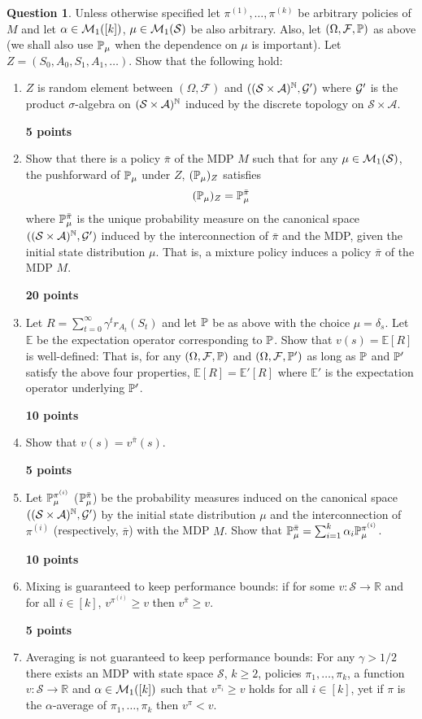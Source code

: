 \documentclass{article}
\newcommand{\R}{\mathbb{R}}
\DeclareMathOperator*{\1}{\mathbbm{1}}
\newcommand{\E}{\mathbb E}
\newcommand{\cF}{\mathcal{F}}
\newcommand{\0}{\mathbf{0}}
\newcounter{DocPoints}
\newcounter{QuestionPoints}
\newcommand{\points}[1]{	\par\mbox{}\par\noindent\hfill {\bf #1 points}	\addtocounter{DocPoints}{#1}
	\addtocounter{QuestionPoints}{#1}
}
\theoremstyle{definition}
\newtheorem{question}{Question}
\theoremstyle{remark}
\theoremstyle{theorem}
\newcommand{\cS}{\mathcal{S}}
\newcommand{\cA}{\mathcal{A}}
\begin{document}
\begin{question}
Unless otherwise specified let
 $\pi^{(1)},\dots,\pi^{(k)}$ be arbitrary policies of $M$ and let $\alpha\in \mathcal{M}_1([k])$, $\mu \in \cM_1(\cS)$ be also arbitrary.
 Also, let $(\Omega,\cF,\PP)$ as above (we shall also use $\mathbb{P}_\mu$ when the dependence on $\mu$ is important).
 Let
 $Z = (S_0,A_0,S_1,A_1,\dots)$.
Show that the following hold:
\begin{enumerate}
\item $Z$ is random element between $(\Omega,\cF)$ and $((\cS\times \cA)^{\N},\cG')$ where $\mathcal{G}'$ is the product $\sigma$-algebra on $(\cS\times \cA)^{\N}$
induced by the discrete topology on $\cS \times \cA$.
\points{5}
\item
\label{q1:a3:1}
Show that there is a policy $\bar \pi$ of the MDP $M$ such that for any $\mu \in \cM_1(\cS)$,
the pushforward of $\mathbb{P}_\mu$ under $Z$, $(\mathbb{P}_\mu)_Z$ satisfies
\[
(\mathbb{P}_\mu)_Z =\mathbb{P}_\mu^{\bar \pi}
\]
where $\mathbb{P}_\mu^{\bar \pi}$ is the unique probability measure on
the canonical space $((\cS\times \cA)^{\N},\cG')$
induced
by the interconnection of  $\bar \pi$ and the MDP, given the initial state distribution $\mu$.
That is, a mixture policy induces a policy $\bar \pi$ of the MDP $M$.
\points{20}
\item
Let $R=\sum_{t=0}^\infty \gamma^t r_{A_t}(S_t)$ and
let $\mathbb{P}$ be as above with the choice $\mu= \delta_s$. Let $\E$ be the expectation operator
corresponding to $\mathbb{P}$.
Show that $v(s)=\E[R]$ is well-defined:
That is,
for any $(\Omega,\cF,\PP)$ and $(\Omega,\cF,\PP')$ as long as $\mathbb{P}$ and $\mathbb{P}'$ satisfy the above four properties, $\E[R]=\E'[R]$ where $\E'$ is the expectation operator underlying $\mathbb{P}'$.
\points{10}
\item
Show that $v(s) = v^{\bar \pi}(s)$.
\points{5}
\item Let $\mathbb{P}_\mu^{\pi^{(i)}}$ ($\mathbb{P}_{\mu}^{\bar \pi}$) be the
probability measures induced on the canonical space
$((\cS \times \cA)^{\N},\cG')$ by the initial state distribution $\mu$ and the interconnection of
$\pi^{(i)}$ (respectively, $\bar \pi$) with the MDP $M$. Show that
$\mathbb{P}_{\mu}^{\bar \pi} = \sum_{i=1}^k \alpha_i \mathbb{P}_{\mu}^{\pi^{(i)}}$.
\points{10}
\item Mixing is guaranteed to keep performance bounds:
if for some
$v:\cS \to \R$ and for all $i\in [k]$,
$v^{\pi^{(i)}}\ge v$ then $v^{\bar \pi}\ge v$.
\points{5}
\item Averaging is not guaranteed to keep performance bounds:
For any $\gamma>1/2$
there exists an MDP with state space $\cS$, $k\ge 2$, policies $\pi_1,\dots,\pi_k$, a function $v:\cS \to \R$ and $\alpha\in \mathcal{M}_1([k])$ such that $v^{\pi_i}\ge v$ holds for all $i\in [k]$, yet if $\pi$ is the $\alpha$-average of $\pi_1,\dots,\pi_k$ then $v^\pi<v$.

\end{enumerate}
\end{question}
\end{document}
